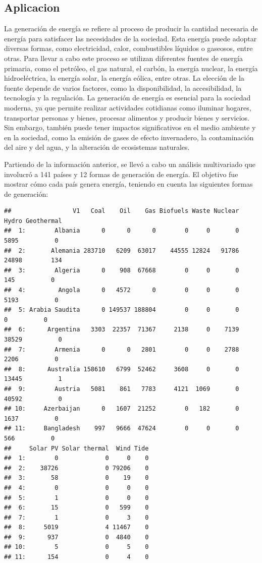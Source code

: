\documentclass[
]{article}
\begin{document}
\hypertarget{aplicacion}{%
\subsection{Aplicacion}\label{aplicacion}}

La generación de energía se refiere al proceso de producir la cantidad
necesaria de energía para satisfacer las necesidades de la sociedad.
Esta energía puede adoptar diversas formas, como electricidad, calor,
combustibles líquidos o gaseosos, entre otras. Para llevar a cabo este
proceso se utilizan diferentes fuentes de energía primaria, como el
petróleo, el gas natural, el carbón, la energía nuclear, la energía
hidroeléctrica, la energía solar, la energía eólica, entre otras. La
elección de la fuente depende de varios factores, como la
disponibilidad, la accesibilidad, la tecnología y la regulación. La
generación de energía es esencial para la sociedad moderna, ya que
permite realizar actividades cotidianas como iluminar hogares,
transportar personas y bienes, procesar alimentos y producir bienes y
servicios. Sin embargo, también puede tener impactos significativos en
el medio ambiente y en la sociedad, como la emisión de gases de efecto
invernadero, la contaminación del aire y del agua, y la alteración de
ecosistemas naturales.

Partiendo de la información anterior, se llevó a cabo un análisis
multivariado que involucró a 141 países y 12 formas de generación de
energía. El objetivo fue mostrar cómo cada país genera energía, teniendo
en cuenta las siguientes formas de generación:

\begin{verbatim}
##                 V1   Coal    Oil    Gas Biofuels Waste Nuclear Hydro Geothermal
##  1:        Albania      0      0      0        0     0       0  5895          0
##  2:       Alemania 283710   6209  63017    44555 12824   91786 24898        134
##  3:        Algeria      0    908  67668        0     0       0   145          0
##  4:         Angola      0   4572      0        0     0       0  5193          0
##  5: Arabia Saudita      0 149537 188804        0     0       0     0          0
##  6:      Argentina   3303  22357  71367     2138     0    7139 38529          0
##  7:        Armenia      0      0   2801        0     0    2788  2206          0
##  8:      Australia 158610   6799  52462     3608     0       0 13445          1
##  9:        Austria   5081    861   7783     4121  1069       0 40592          0
## 10:     Azerbaijan      0   1607  21252        0   182       0  1637          0
## 11:     Bangladesh    997   9666  47624        0     0       0   566          0
##     Solar PV Solar thermal  Wind Tide
##  1:        0             0     0    0
##  2:    38726             0 79206    0
##  3:       58             0    19    0
##  4:        0             0     0    0
##  5:        1             0     0    0
##  6:       15             0   599    0
##  7:        1             0     3    0
##  8:     5019             4 11467    0
##  9:      937             0  4840    0
## 10:        5             0     5    0
## 11:      154             0     4    0
\end{verbatim}
\end{document}
